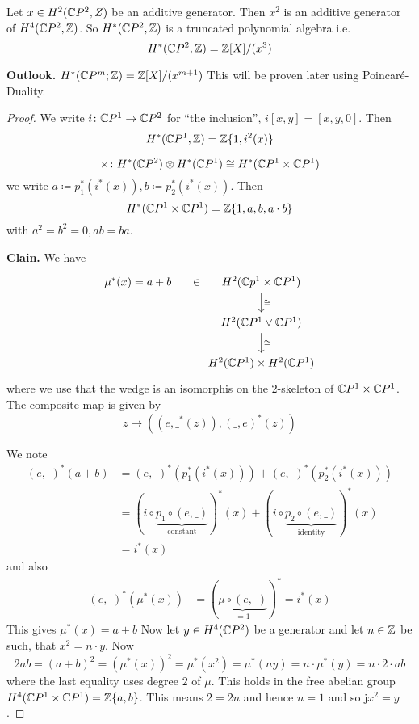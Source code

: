 \documentclass[language=english]{TemplateLecture}
\begin{document}
\begin{proposition}
    Let \(x \in H^2(\mathbb{C} P^2, Z)\) be an additive generator. Then \(x^2\) is an additive generator of \(H^4(\mathbb{C} P^2, \mathbb{Z})\). So \(H^*(\mathbb{C} P^2, \mathbb{Z})\) is a truncated polynomial algebra i.e.
    \[H^*(\mathbb{C} P ^2, \mathbb{Z}) = \mathbb{Z}[X]/ (x^3)\]

\end{proposition}

\textbf{Outlook.} \(H^*(\mathbb{C} P^m; \mathbb{Z}) = \mathbb{Z}[X]/(x^{m+1})\)
This will be proven later using Poincaré-Duality.

\begin{proof}
    We write \(i \colon \mathbb{C} P ^1 \to \mathbb{C} P ^2\) for \enquote{the inclusion}, \(i[x,y] = [x,y,0]\). Then
    \[H^*(\mathbb{C} P^1, \mathbb{Z}) = \mathbb{Z}\{1, i^2(x)\}\]

    \[\times\colon H^*(\mathbb{C} P^2) \otimes H^*(\mathbb{C} P^1) \cong H^*(\mathbb{C} P^1\times \mathbb{C} P^1)\]
    we write \(a \coloneq p_1^*(i^*(x)), b \coloneq p_2^*(i^*(x))\). Then
    \[H^*(\mathbb{C} P^1 \times \mathbb{C} P^1) = \mathbb{Z}\{1,a,b,a\cdot b\}\]
    with \(a^2 = b^2 = 0, ab = ba\).

    \textbf{Clain.} We have
    \[\begin{tikzcd}
        \mu^*(x) = a+b \ar[r, phantom, "\in"] &  H^2(\IC p^1 \times \IC P^1) \ar[d, "\cong"] \\
        & H^2(\IC P^1 \vee \IC P^1) \ar[d, "\cong"] \\
        & H^2(\IC P^1) \times H^2(\IC P^1)
    \end{tikzcd}\]
    where we use that the wedge is an isomorphis on the \(2\)-skeleton of \(\mathbb{C} P^1 \times \mathbb{C} P^1\). The composite map is given by
    \[z \mapsto ((e, \_^*(z)), (\_, e)^*(z))\]

    We note
    \[\begin{split} 
        (e,\_)^*(a+b) &= (e, \_)^*(p_1^*(i^*(x))) + (e, \_)^*(p_2^*(i^*(x))) \\
        &= (i \circ \underbrace{p_1 \circ(e, \_)}_{\text{constant}})^*(x) + (i \circ \underbrace{p_2 \circ (e, \_)}_{\text{identity}})^*(x) \\
        &=  i^*(x)
    \end{split}\]
    and also
    \[\begin{split}
        (e, \_)^*(\mu^*(x)) &= (\underbrace{\mu \circ (e, \_)}_{= 1})^* = i^*(x)
    \end{split}\]
    This gives \(\mu^*(x) = a+b\)
    Now let \(y\in H^4(\mathbb{C} P^2)\) be a generator and let \(n \in \mathbb{Z}\) be such, that \(x^2 = n\cdot y\). Now
    \[2ab = (a+b)^2 = (\mu^*(x))^2 = \mu^*(x^2) = \mu^*(ny) = n \cdot \mu^*(y) = n\cdot 2 \cdot ab\]
    where the last equality uses degree \(2\) of \(\mu\). This holds in the free abelian group \(H^4(\mathbb{C} P^1 \times \mathbb{C} P^1) = \mathbb{Z}\{a,b\}\). This means \(2 = 2n\) and hence \(n = 1\) and so j\(x^2 = y\).
\end{proof}
\end{document}
